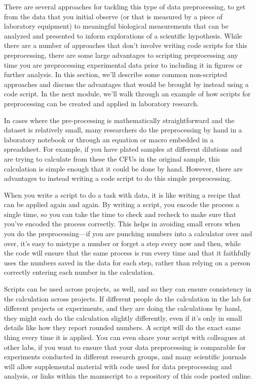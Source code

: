 \documentclass[]{tufte-book}
\begin{document}
There are several approaches for tackling this type of data preprocessing, to
get from the data that you initial observe (or that is measured by a piece of
laboratory equipment) to meaningful biological measurements that can be analyzed
and presented to inform explorations of a scientific hypothesis. While there are
a number of approaches that don't involve writing code scripts for this
preprocessing, there are some large advantages to scripting preprocessing any
time you are preprocessing experimental data prior to including it in figures or
further analysis. In this section, we'll describe some common non-scripted
approaches and discuss the advantages that would be brought by instead using a
code script. In the next module, we'll walk through an example of how scripts
for preprocessing can be created and applied in laboratory research.

In cases where the pre-processing is mathematically straightforward and the
dataset is relatively small, many researchers do the preprocessing by hand in a
laboratory notebook or through an equation or macro embedded in a spreadsheet.
For example, if you have plated samples at different dilutions and are trying to
calculate from these the CFUs in the original sample, this calculation is simple
enough that it could be done by hand. However, there are advantages to instead
writing a code script to do this simple preprocessing.

When you write a script to do a task with data, it is like writing a recipe that
can be applied again and again. By writing a script, you encode the process a
single time, so you can take the time to check and recheck to make sure that
you've encoded the process correctly. This helps in avoiding small errors when
you do the preprocessing---if you are punching numbers into a calculator over
and over, it's easy to mistype a number or forget a step every now and then,
while the code will ensure that the same process is run every time and that it
faithfully uses the numbers saved in the data for each step, rather than relying
on a person correctly entering each number in the calculation.

Scripts can be used across projects, as well, and so they can ensure consistency
in the calculation across projects. If different people do the calculation in
the lab for different projects or experiments, and they are doing the
calculations by hand, they might each do the calculation slightly differently,
even if it's only in small details like how they report rounded numbers. A
script will do the exact same thing every time it is applied. You can even share
your script with colleagues at other labs, if you want to ensure that your data
preprocessing is comparable for experiments conducted in different research
groups, and many scientific journals will allow supplemental material with
code used for data preprocessing and analysis, or links within the manuscript
to a repository of this code posted online.
\end{document}
